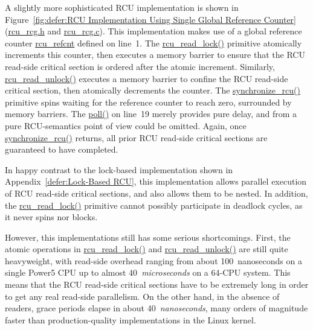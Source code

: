 A slightly more sophisticated RCU implementation is shown in
Figure~\ref{fig:defer:RCU Implementation Using Single Global Reference Counter}
(\url{rcu_rcg.h} and \url{rcu_rcg.c}).
This implementation makes use of a global reference counter
\url{rcu_refcnt} defined on line~1.
The \url{rcu_read_lock()} primitive atomically increments this
counter, then executes a memory barrier to ensure that the
RCU read-side critical section is ordered after the atomic
increment.
Similarly, \url{rcu_read_unlock()} executes a memory barrier to
confine the RCU read-side critical section, then atomically
decrements the counter.
The \url{synchronize_rcu()} primitive spins waiting for the reference
counter to reach zero, surrounded by memory barriers.
The \url{poll()} on line~19 merely provides pure delay, and from
a pure RCU-semantics point of view could be omitted.
Again, once \url{synchronize_rcu()} returns, all prior
RCU read-side critical sections are guaranteed to have completed.

In happy contrast to the lock-based implementation shown in
Appendix~\ref{defer:Lock-Based RCU}, this implementation
allows parallel execution of RCU read-side critical sections,
and also allows them to be nested.
In addition, the \url{rcu_read_lock()} primitive cannot possibly
participate in deadlock cycles, as it never spins nor blocks.

However, this implementations still has some serious shortcomings.
First, the atomic operations in \url{rcu_read_lock()} and
\url{rcu_read_unlock()} are still quite  heavyweight,
with read-side overhead ranging from about 100~nanoseconds on
a single Power5 CPU up to almost 40~\emph{microseconds}
on a 64-CPU system.
This means that the RCU read-side critical sections
have to be extremely long in order to get any real
read-side parallelism.
On the other hand, in the absence of readers, grace periods elapse
in about 40~\emph{nanoseconds}, many orders of magnitude faster
than production-quality implementations in the Linux kernel.

 \QuickQuizEnd

